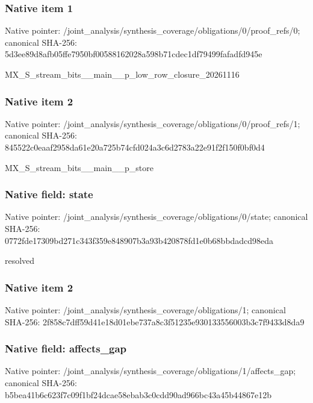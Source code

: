 \documentclass[10pt,a4paper]{article}
\begin{document}
\subsubsection{Native item 1}
Native pointer: /joint\_\allowbreak{}analysis/synthesis\_\allowbreak{}coverage/obligations/0/proof\_\allowbreak{}refs/0; canonical SHA-256: 5d3ee89d8afb05ffe7950bf00588162028a598b71cdec1df79499fafadfd945e

\begingroup\raggedright\sloppy MX\_\allowbreak{}S\_\allowbreak{}stream\_\allowbreak{}bits\_\allowbreak{}\_\allowbreak{}main\_\allowbreak{}\_\allowbreak{}p\_\allowbreak{}low\_\allowbreak{}row\_\allowbreak{}closure\_\allowbreak{}20261116\par\endgroup

\subsubsection{Native item 2}
Native pointer: /joint\_\allowbreak{}analysis/synthesis\_\allowbreak{}coverage/obligations/0/proof\_\allowbreak{}refs/1; canonical SHA-256: 845522c0eaaf2958da61e20a725b74cfd024a3c6d2783a22e91f2f150f0bf0d4

\begingroup\raggedright\sloppy MX\_\allowbreak{}S\_\allowbreak{}stream\_\allowbreak{}bits\_\allowbreak{}\_\allowbreak{}main\_\allowbreak{}\_\allowbreak{}p\_\allowbreak{}store\par\endgroup

\subsubsection{Native field: state}
Native pointer: /joint\_\allowbreak{}analysis/synthesis\_\allowbreak{}coverage/obligations/0/state; canonical SHA-256: 0772fde17309bd271c343f359e848907b3a93b420878fd1e0b68bbdadcd98eda

\begingroup\raggedright\sloppy resolved\par\endgroup

\subsubsection{Native item 2}
Native pointer: /joint\_\allowbreak{}analysis/synthesis\_\allowbreak{}coverage/obligations/1; canonical SHA-256: 2f858c7dff59d41e18d01ebe737a8c3f51235e930133556003b3c7f9433d8da9

\subsubsection{Native field: affects\_\allowbreak{}gap}
Native pointer: /joint\_\allowbreak{}analysis/synthesis\_\allowbreak{}coverage/obligations/1/affects\_\allowbreak{}gap; canonical SHA-256: b5bea41b6c623f7c09f1bf24dcae58ebab3c0cdd90ad966bc43a45b44867e12b
\end{document}

